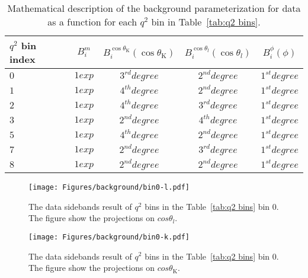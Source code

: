 \begin{table*}[!htb]
    \begin{center}
        \begin{small}
            \caption{Mathematical description of the background parameterization for 
                data as a function for each $q^2$ bin in Table~\ref{tab:q2 bins}.
                \label{tab:background shape}}
            \begin{tabular}{|l|c|c|c|c|}
                \hline
                $q^2$ bin index   & $B_i^m$         & $B_i^{\cos\theta_\mathrm{K}}(\cos\theta_\mathrm{K})$    & $B_i^{\cos\theta_l}(\cos\theta_l)$  &  $B_i^{\phi}(\phi)$   \\
                \hline
                $ 0$    &  $ 1 exp $      &  $ 3^{rd} degree $  & $ 2^{nd} degree $ & $ 1^{st} degree $    \\
                $ 1 $   &  $ 1 exp$       &  $ 4^{th} degree$    & $ 2^{nd} degree $ & $ 1^{st} degree $\\
                $ 2$    &  $ 1 exp $      &  $ 4^{th} degree$    & $ 3^{rd} degree $ & $ 1^{st} degree $ \\
                $3 $    &  $ 1 exp$       &  $ 2^{nd} degree$   & $ 4^{th} degree $ & $ 1^{st} degree $   \\
                $ 5 $   &  $1 exp $      &   $ 4^{th} degree$   & $ 2^{nd} degree  $ & $ 1^{st} degree $\\
                $ 7 $   &  $1 exp$        &  $ 2^{nd} degree$   & $3^{rd} degree $  & $ 1^{st} degree$\\
                $ 8 $   &  $1 exp$        &  $ 2^{nd} degree$   & $2^{nd} degree$   & $1^{st} degree$\\
                \hline
            \end{tabular}
        \end{small}
    \end{center}
\end{table*}

\begin{figure}[!hbt]
  \centering
  \texttt{[image: Figures/background/bin0-l.pdf]}
  \caption{The data sidebands result of $q^2$ bins in the Table~\ref{tab:q2 bins} bin 0. The figure
    show the projections on $cos\theta_l$.}
  \label{fig:bin0-bkg-l}
\end{figure}


\begin{figure}[!hbt]
  \centering
  \texttt{[image: Figures/background/bin0-k.pdf]}
  \caption{The data sidebands result of $q^2$ bins in the Table~\ref{tab:q2 bins} bin 0. The figure
    show the projections on $cos\theta_\mathrm{K}$.}
  \label{fig:bin0-bkg-k}
\end{figure}

